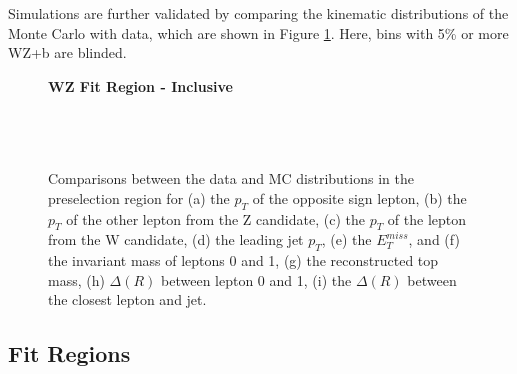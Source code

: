 Simulations are further validated by comparing the kinematic distributions of the Monte Carlo with data, which are shown in Figure \ref{kin:inclusive}. Here, bins with 5\% or more WZ+b are blinded.


\begin{figure}[H] 
    \centering
    \textbf{WZ Fit Region - Inclusive}\\
    \\      
    \\
    \\
    \caption{Comparisons between the data and MC distributions in the preselection region for (a) the $p_T$ of the opposite sign lepton, (b) the $p_T$ of the other lepton from the Z candidate, (c) the $p_T$ of the lepton from the W candidate, (d) the leading jet $p_T$, (e) the $E_T^{miss}$, and (f) the invariant mass of leptons 0 and 1, (g) the reconstructed top mass, (h) $\Delta(R)$  between lepton 0 and 1, (i) the $\Delta(R)$ between the closest lepton and jet.}
    \label{kin:inclusive}
\end{figure}

\subsection{Fit Regions}
\label{subsec:regions}

